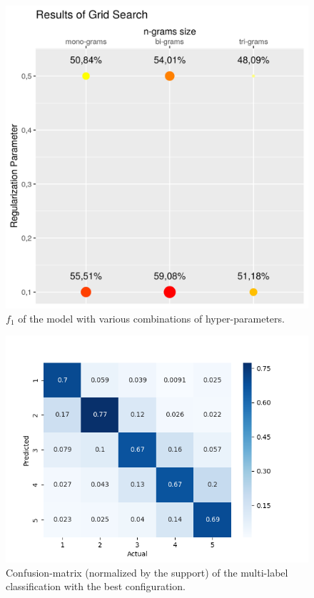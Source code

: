 \documentclass[fleqn,10pt]{SelfArx}
\begin{document}
\begin{figure}[!h]
    \includegraphics[width=\linewidth]{multi_class_grid_search.png}
    \caption{$f_1$ of the model with various combinations of hyper-parameters.}
    \label{fig:grid_search_multilabel}
\end{figure}

\begin{figure}[!h]
    \includegraphics[width=\linewidth]{confusionMatrix_prec.png}
    \caption{Confusion-matrix (normalized by the support) of the multi-label classification with the best configuration.}
    \label{fig:conf_matrix_multilabel}
\end{figure}
\end{document}
